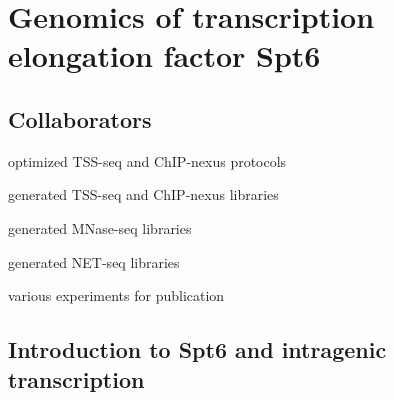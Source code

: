 \chapter{Genomics of transcription elongation factor Spt6}

\section{Collaborators}

\begin{description}[align=right, labelwidth=5cm, noitemsep]
    \item [Steve Doris] optimized TSS-seq and ChIP-nexus protocols
    \item [] generated TSS-seq and ChIP-nexus libraries
    \item [Olga Viktorovskaya] generated MNase-seq libraries
    \item [Magdalena Murawska] generated NET-seq libraries
    \item [Dan Spatt] various experiments for publication
\end{description}

\section{Introduction to Spt6 and intragenic transcription}

